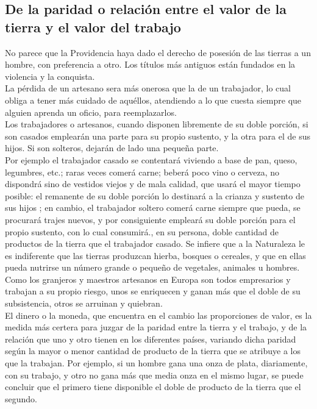 \documentclass[10pt]{article}
\begin{document}
\begin{multicols}{1}
\section*{De la paridad o relación entre el valor de la tierra y el valor del trabajo}
No parece que la Providencia haya dado el derecho de posesión de las tierras a un hombre, con preferencia a otro. Los títulos más antiguos están fundados en la violencia y la conquista.\\
La pérdida de un artesano sera más onerosa que la de un trabajador, lo cual obliga a tener más cuidado de aquéllos, atendiendo a lo que cuesta siempre que alguien aprenda un oficio, para reemplazarlos.\\
Los trabajadores o artesanos, cuando disponen libremente de su doble porción, si son casados emplearán una parte para su propio sustento, y la otra para el de sus hijos. Si son solteros, dejarán de lado una pequeña parte.\\
Por ejemplo el trabajador casado se contentará viviendo a base de pan, queso, legumbres, etc.; raras veces comerá carne; beberá poco vino o cerveza, no dispondrá sino de vestidos viejos y de mala calidad, que usará el mayor tiempo posible: el remanente de su doble porción lo destinará a la crianza y sustento de sus hijos ; en cambio, el trabajador soltero comerá carne siempre que pueda, se procurará trajes nuevos, y por consiguiente empleará su doble porción para el propio sustento, con lo cual consumirá., en su persona, doble cantidad de productos de la tierra que el trabajador casado. Se infiere que a la Naturaleza le es indiferente que las tierras produzcan hierba, bosques o cereales, y que en ellas pueda nutrirse un número grande o pequeño de vegetales, animales u hombres.\\
Como los granjeros y maestros artesanos en Europa son todos empresarios y trabajan a su propio riesgo, unos se enriquecen y ganan más que el doble de su subsistencia, otros se arruinan y quiebran.\\
El dinero o la moneda, que encuentra en el cambio las proporciones de valor, es la medida más certera para juzgar de la paridad entre la tierra y el trabajo, y de la relación que uno y otro tienen en los diferentes países, variando dicha paridad según la mayor o menor cantidad de producto de la tierra que se atribuye a los que la trabajan. Por ejemplo, si un hombre gana una onza de plata, diariamente, con su trabajo, y otro no gana más que media onza en el mismo lugar, se puede concluir que el primero tiene disponible el doble de producto de la tierra que el segundo.

\end{multicols}
\end{document}
